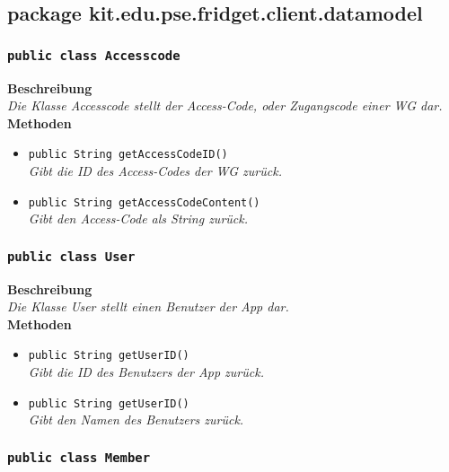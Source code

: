 \subsection{package kit.edu.pse.fridget.client.datamodel}
\subsubsection{\texttt{public class Accesscode}}

	\textbf{Beschreibung} \\
	\textit{Die Klasse Accesscode stellt der Access-Code, oder Zugangscode einer WG dar.} \\

	\textbf{Methoden}
	\begin{itemize}
		\item{\texttt{public String getAccessCodeID()}}\\
		\textit{Gibt die ID des Access-Codes der WG zurück.}\\
		\item{\texttt{public String getAccessCodeContent()}}\\
		\textit{Gibt den Access-Code als String zurück.}\\
	\end{itemize}

	

\subsubsection{\texttt{public class User}}

	\textbf{Beschreibung} \\
	\textit{Die Klasse User stellt einen Benutzer der App dar.}\\

	\textbf{Methoden}
	\begin{itemize}
	\item{\texttt{public String getUserID()}}\\
	\textit{Gibt die ID des Benutzers der App zurück.}\\
	\item{\texttt{public String getUserID()}}\\
	\textit{Gibt den Namen des Benutzers zurück.}\\
	\end{itemize}

	

\subsubsection{\texttt{public class Member}}

